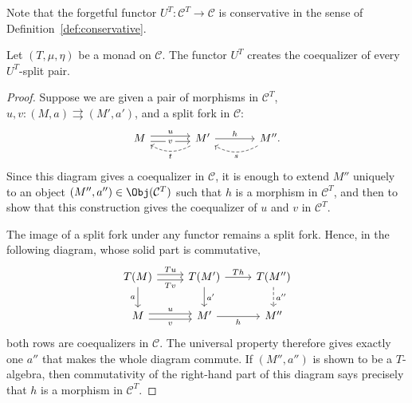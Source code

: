 Note that the forgetful functor $U^T:\mathcal{C}^T\to\mathcal{C}$ is
conservative in the sense of Definition~\ref{def:conservative}.

\begin{lemma}\label{prop:UT-split-fork}
	Let $(T,\mu,\eta)$ be a monad on $\mathcal{C}$. The functor $U^T$ creates
	the coequalizer of every $U^T$-split pair.
\end{lemma}
\begin{proof}
	Suppose we are given a pair of morphisms in $\mathcal{C}^T$,
	$u,v:(M,a)\rightrightarrows(M',a')$, and a split fork in $\mathcal{C}$:
	\begin{equation*}\begin{tikzcd}[column sep=large]
		M \arrow[shift left, r, "u"] \arrow[shift right, r, "v" description] & M' \arrow[r, "h"] \arrow[dashed, l, bend left, "t"] & M'' \arrow[dashed, l, bend left, "s"].
	\end{tikzcd}\end{equation*}
	Since this diagram gives a coequalizer in $\mathcal{C}$, it is enough to
	extend $M''$ uniquely to an object
	$(M'',a'')\in\Obj(\mathcal{C}^T)$ such that $h$ is a morphism in
	$\mathcal{C}^T$, and then to show that this construction gives the
	coequalizer of $u$ and $v$ in $\mathcal{C}^T$.

	The image of a split fork under any functor remains a split fork. Hence,
	in the following diagram, whose solid part is commutative,
	\[\begin{tikzcd}
		T(M) \arrow[shift left, r, "Tu"] \arrow[shift right, r, "Tv"'] \arrow[d, "a"'] & T(M') \arrow[r, "Th"] \arrow[d, "{a'}"] & T(M'') \arrow[dashed, d, "{a''}"] \\
		M \arrow[shift left, r, "u"] \arrow[shift right, r, "v"'] & M' \arrow[r, "h"'] & M''
	\end{tikzcd}\]
	both rows are coequalizers in $\mathcal{C}$. The universal property
	therefore gives exactly one $a''$ that makes the whole diagram commute. If
	$(M'',a'')$ is shown to be a $T$-algebra, then commutativity of the
	right-hand part of this diagram says precisely that $h$ is a morphism in
	$\mathcal{C}^T$.


\end{proof}
